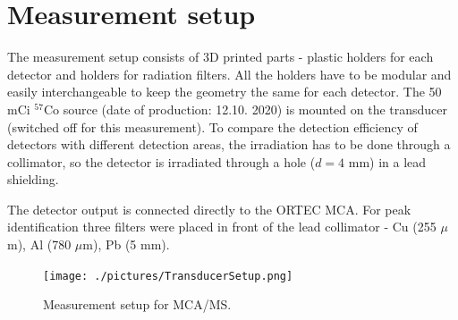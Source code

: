 \section{Measurement setup}
The measurement setup consists of 3D printed parts - plastic holders for each detector and holders for radiation filters. All the holders have to be modular and easily interchangeable to keep the geometry the same for each detector.
The 50 mCi $^{57}$Co source (date of production: 12.10. 2020) is mounted on the transducer (switched off for this measurement). To compare the detection efficiency of detectors with different detection areas, the irradiation has to be done through a collimator, so the detector is irradiated through a hole ($d = 4$ mm) in a lead shielding.
\par
The detector output is connected directly to the ORTEC MCA. For peak identification three filters were placed in front of the lead collimator - Cu (255 $\mu$m), Al (780 $\mu$m), Pb (5 mm).



\begin{figure}[H]
 \centering
 \texttt{[image: ./pictures/TransducerSetup.png]}
 \caption{Measurement setup for MCA/MS.}
 \label{meas setup}
 
\end{figure}

